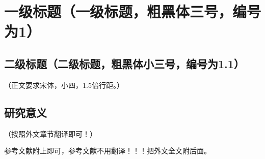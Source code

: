 
\newpage

\section{一级标题（一级标题，粗黑体三号，编号为1）}

\subsection{二级标题（二级标题，粗黑体小三号，编号为1.1）}


（正文要求宋体，小四，1.5倍行距。）

\subsection{研究意义}

（按照外文章节翻译即可！）

参考文献附上即可，参考文献不用翻译！！！把外文全文附后面。
